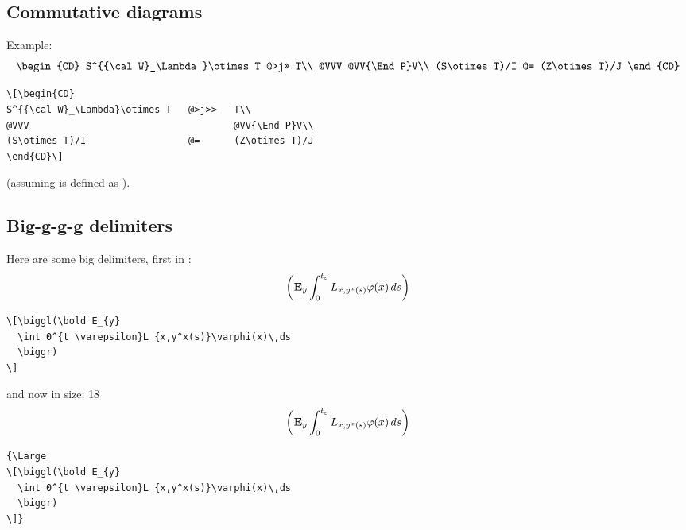\subsection{Commutative diagrams}

Example:
\[\begin{CD}
S^{{\cal W}_\Lambda}\otimes T   @>j>>   T\\
@VVV                                    @VV{\End P}V\\
(S\otimes T)/I                  @=      (Z\otimes T)/J
\end{CD}\]
\begin{verbatim}
\[\begin{CD}
S^{{\cal W}_\Lambda}\otimes T   @>j>>   T\\
@VVV                                    @VV{\End P}V\\
(S\otimes T)/I                  @=      (Z\otimes T)/J
\end{CD}\]
\end{verbatim}
(assuming  is defined as ).
%
%
%
%

\subsection{Big-g-g-g delimiters}
Here are some big delimiters, first in :
\[\biggl(\bold E_{y}
  \int_0^{t_\varepsilon}L_{x,y^x(s)}\varphi(x)\,ds
  \biggr)
\]
\begin{verbatim}
\[\biggl(\bold E_{y}
  \int_0^{t_\varepsilon}L_{x,y^x(s)}\varphi(x)\,ds
  \biggr)
\]
\end{verbatim}
and now in  size:
{\makeatletter\@setsize\Large{18\p@}\xivpt\@xivpt
\[\biggl(\bold E_{y}
  \int_0^{t_\varepsilon}L_{x,y^x(s)}\varphi(x)\,ds
  \biggr)
\]}
\begin{verbatim}
{\Large
\[\biggl(\bold E_{y}
  \int_0^{t_\varepsilon}L_{x,y^x(s)}\varphi(x)\,ds
  \biggr)
\]}
\end{verbatim}

\makeatletter

\def\@makecol{\ifvoid\footins \setbox\@outputbox\box\@cclv
   \else\setbox\@outputbox
     \vbox{\boxmaxdepth \maxdepth
     \unvbox\@cclv\vskip\skip\footins\footnoterule\unvbox\footins}\fi
  \xdef\@freelist{\@freelist\@midlist}\gdef\@midlist{}\@combinefloats
  \setbox\@outputbox\hbox{\vrule width.1pt
        \vbox to\@colht{\boxmaxdepth\maxdepth
         \@texttop\dimen128=\dp\@outputbox\unvbox\@outputbox
         \vskip-\dimen128\@textbottom}%
        \vrule width.1pt}%
     \global\maxdepth\@maxdepth}

